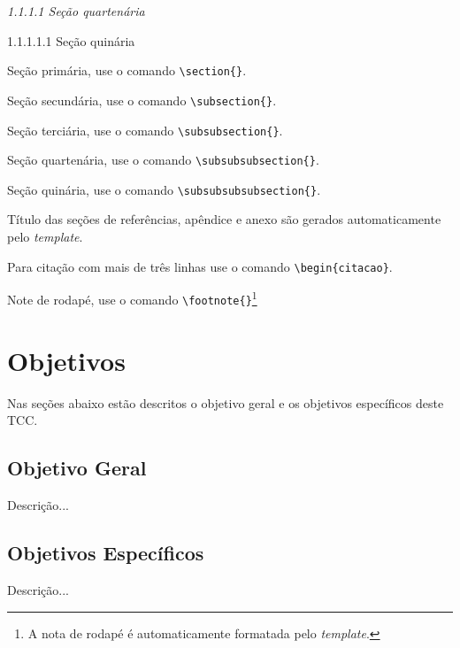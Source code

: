 \textit{1.1.1.1 Seção quartenária}

1.1.1.1.1 Seção quinária

\vspace{12pt}

\begin{alineas}
    \item Seção primária, use o comando \verb|\section{}|.
    \item Seção secundária, use o comando \verb|\subsection{}|.
    \item Seção terciária, use o comando \verb|\subsubsection{}|.
    \item Seção quartenária, use o comando \verb|\subsubsubsection{}|.
    \item Seção quinária, use o comando \verb|\subsubsubsubsection{}|.
    \item Título das seções de referências, apêndice e anexo são gerados automaticamente pelo \textit{template}.
    \item Para citação com mais de três linhas use o comando \verb|\begin{citacao}|.
    \item Note de rodapé, use o comando \verb|\footnote{}|\footnote{A nota de rodapé é automaticamente formatada pelo \textit{template}.}
\end{alineas}

\section{Objetivos}


Nas seções abaixo estão descritos o objetivo geral e os objetivos específicos deste TCC.


\subsection{Objetivo Geral}


Descrição...


\subsection{Objetivos Específicos}


Descrição...